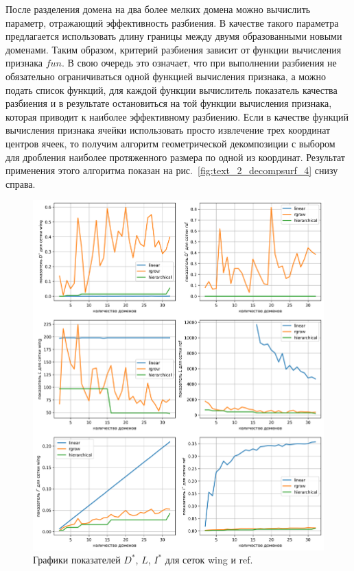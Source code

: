 После разделения домена на два более мелких домена можно вычислить параметр, отражающий эффективность разбиения.
В качестве такого параметра предлагается использовать длину границы между двумя образованными новыми доменами.
Таким образом, критерий разбиения зависит от функции вычисления признака $fun$.
В свою очередь это означает, что при выполнении разбиения не обязательно ограничиваться одной функцией вычисления признака, а можно подать список функций, для каждой функции вычислитель показатель качества разбиения и в результате остановиться на той функции вычисления признака, которая приводит к наиболее эффективному разбиению.
Если в качестве функций вычисления признака ячейки использовать просто извлечение трех координат центров ячеек, то получим алгоритм геометрической декомпозиции с выбором для дробления наиболее протяженного размера по одной из координат.
Результат применения этого алгоритма показан на рис.~\ref{fig:text_2_decompsurf_4} снизу справа.

\begin{figure}[H]
\centering
\includegraphics[width=1.0\textwidth]{fig/par_decompsurf_qual.png}
\singlespacing
{}\caption{Графики показателей $D^{*}$, $L$, $I^{*}$ для сеток wing и ref.}
\label{fig:text_2_decompsurf_qual}
\end{figure}

